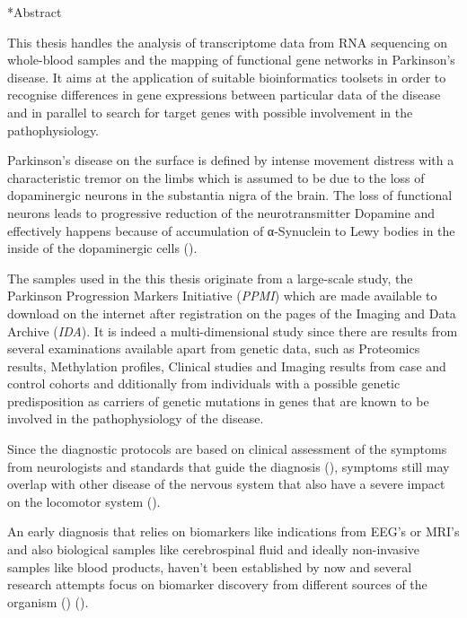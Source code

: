 \documentclass[12pt]{report}
\makeatletter
\let\oldchapter\chapter
\renewcommand{\chapter}{\@ifstar{\starchapter}{\nostarchapter}}
\newcommand{\starchapter}[1]{\oldchapter*{#1}\thispagestyle{mainstyle}}
\newcommand{\nostarchapter}[1]{\oldchapter{#1}\thispagestyle{mainstyle}}
\makeatother
\begin{document}
    \chapter*{Abstract}
            \par
                This thesis handles the analysis of transcriptome data from RNA sequencing on whole-blood samples and the mapping of functional gene networks in Parkinson's disease. It aims at the application of suitable bioinformatics toolsets in order to recognise differences in gene expressions between particular data of the disease and in parallel to search for target genes with possible involvement in the pathophysiology.
            \par
                Parkinson's disease on the surface is defined by intense movement distress with a characteristic tremor on the limbs which is assumed to be due to the loss of dopaminergic neurons in the substantia nigra of the brain. The loss of functional neurons leads to progressive reduction of the neurotransmitter Dopamine and effectively happens because of accumulation of α-Synuclein to Lewy bodies in the inside of the dopaminergic cells (\emph{\cite{Balestrino2020ParkinsonDisease}}).
            \par
                The samples used in the this thesis originate from a large-scale study, the Parkinson Progression Markers Initiative (\emph{PPMI}) which are made available to download on the internet after registration on the pages of the Imaging and Data Archive (\emph{IDA}). It is indeed a multi-dimensional study since there are results from several examinations available apart from genetic data, such as Proteomics results, Methylation profiles, Clinical studies and Imaging results from case and control cohorts and dditionally from individuals with a possible genetic predisposition as carriers of genetic mutations in genes that are known to be involved in the pathophysiology of the disease.
            \par
                Since the diagnostic protocols are based on clinical assessment of the symptoms from neurologists and standards that guide the diagnosis (\emph{\cite{Koller2018TableGuidelines}}), symptoms still may overlap with other disease of the nervous system that also have a severe impact on the locomotor system (\emph{\cite{Tolosa2021ChallengesDisease}}).
            \par
                An early diagnosis that relies on biomarkers like indications from EEG's or MRI's and also biological samples like cerebrospinal fluid and ideally non-invasive samples like blood products, haven't been established by now and several research attempts focus on biomarker discovery from different sources of the organism (\emph{\cite{Miller2015BiomarkersFuture}}) (\emph{\cite{Maitin2022SurveyReview}}).
\end{document}
